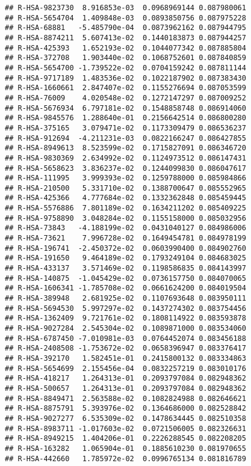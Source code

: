 \documentclass[
]{article}
\begin{document}
\begin{verbatim}
## R-HSA-9823730  8.916853e-03  0.0968969144 0.087980061
## R-HSA-5654704  1.409848e-03  0.0893850756 0.087975228
## R-HSA-68881   -5.485790e-04  0.0873962162 0.087944795
## R-HSA-8874211  5.607413e-02  0.1440183873 0.087944257
## R-HSA-425393   1.652193e-02  0.1044077342 0.087885804
## R-HSA-372708   1.903440e-02  0.1068752601 0.087840859
## R-HSA-5654700 -1.739522e-02  0.0704159242 0.087811144
## R-HSA-9717189  1.483536e-02  0.1022187902 0.087383430
## R-HSA-1660661  2.847407e-02  0.1155276694 0.087053599
## R-HSA-76009    4.020548e-02  0.1272147297 0.087009252
## R-HSA-5676934  6.797181e-02  0.1548858748 0.086914060
## R-HSA-9845576  1.288640e-01  0.2156642514 0.086800280
## R-HSA-375165   3.079471e-02  0.1173309479 0.086536237
## R-HSA-912694  -4.211231e-03  0.0822166247 0.086427855
## R-HSA-8949613  8.523599e-02  0.1715827091 0.086346720
## R-HSA-9830369  2.634992e-02  0.1124973512 0.086147431
## R-HSA-5658623  3.836237e-02  0.1244099830 0.086047617
## R-HSA-111995   3.999393e-02  0.1259788000 0.085984866
## R-HSA-210500   5.331710e-02  0.1388700647 0.085552965
## R-HSA-425366   4.777684e-02  0.1332362848 0.085459445
## R-HSA-5576886  7.801189e-02  0.1634211202 0.085409225
## R-HSA-9758890  3.048284e-02  0.1155158000 0.085032956
## R-HSA-73843   -4.188199e-02  0.0431040127 0.084986006
## R-HSA-73621    7.996728e-02  0.1649454781 0.084978199
## R-HSA-196741  -2.450372e-02  0.0603990400 0.084902760
## R-HSA-191650   9.464189e-02  0.1793249104 0.084683025
## R-HSA-433137   3.571469e-02  0.1198586835 0.084143997
## R-HSA-140875  -1.045429e-02  0.0736157750 0.084070065
## R-HSA-1606341 -1.785708e-02  0.0661624200 0.084019504
## R-HSA-389948   2.681925e-02  0.1107693648 0.083950111
## R-HSA-5694530  5.997297e-02  0.1437274302 0.083754456
## R-HSA-1362409  9.721761e-02  0.1808114922 0.083593878
## R-HSA-9027284  2.545304e-02  0.1089871000 0.083534060
## R-HSA-6787450 -7.010981e-03  0.0764452074 0.083456188
## R-HSA-2408508 -1.753672e-02  0.0658396947 0.083376417
## R-HSA-392170   1.582451e-01  0.2415800132 0.083334863
## R-HSA-5654699  2.155456e-04  0.0832257219 0.083010176
## R-HSA-418217   1.264313e-01  0.2093797084 0.082948362
## R-HSA-500657   1.264313e-01  0.2093797084 0.082948362
## R-HSA-8849471  2.563588e-02  0.1082824988 0.082646621
## R-HSA-8875791  5.393976e-02  0.1364686000 0.082528842
## R-HSA-9027277  6.535309e-02  0.1478634445 0.082510358
## R-HSA-8983711 -1.017603e-02  0.0721506005 0.082326631
## R-HSA-8949215  1.404206e-01  0.2226288545 0.082208205
## R-HSA-163282   1.065904e-01  0.1885610230 0.081970655
## R-HSA-442660   1.785972e-02  0.0996765134 0.081816789

\end{verbatim}
\end{document}
